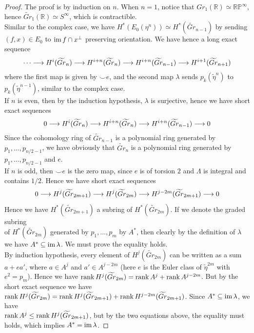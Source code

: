 	\begin{proof}
		The proof is by induction on $n$. When $n=1$, notice that $Gr_1(\mathbb{R})\simeq\mathbb{RP}^\infty$, hence $\widetilde{Gr}_1(\mathbb{R})\simeq S^\infty$, which is contractible. \\
		Similar to the complex case, we have $H^*(E_0(\eta^n))\simeq H^*(\widetilde{Gr}_{n-1})$ by sending $(f,x)\in E_0$ to $\operatorname{\mathrm{im}} f\cap x^\perp$ preserving orientation. We have hence a long exact sequence
		\[ \cdots\longrightarrow H^i(\widetilde{Gr}_n)\longrightarrow H^{i+n}(\widetilde{Gr}_n)\longrightarrow H^{i+n}(\widetilde{Gr}_{n-1})\longrightarrow H^{i+1}(\widetilde{Gr}_{n+1}) \]
		where the first map is given by $\smile e$, and the second map $\lambda$ sends $p_k(\tilde{\eta}^n)$ to $p_k(\tilde{\eta}^{n-1})$, similar to the complex case. \\
		If $n$ is even, then by the induction hypothesis, $\lambda$ is surjective, hence we have short exact sequences 
		\[ 0\longrightarrow H^i(\widetilde{Gr}_n)\longrightarrow H^{i+n}(\widetilde{Gr}_n)\longrightarrow H^{i+n}(\widetilde{Gr}_{n-1})\longrightarrow 0 \]
		Since the cohomology ring of $\widetilde{Gr}_{n-1}$ is a polynomial ring generated by $p_1,\dots,p_{n/2-1}$, we have obviously that $\widetilde{Gr}_n$ is a polynomial ring generated by $p_1,\dots,p_{n/2-1}$ and $e$. \\
		If $n$ is odd, then $\smile e$ is the zero map, since $e$ is of torsion $2$ and $\Lambda$ is integral and contains $1/2$. Hence we have short exact sequences
		\[ 0\longrightarrow H^j(\widetilde{Gr}_{2m+1})\longrightarrow H^j(\widetilde{Gr}_{2m})\longrightarrow H^{j-2m}(\widetilde{Gr}_{2m+1})\longrightarrow 0 \]
		Hence we have $H^*(\widetilde{Gr}_{2m+1})$ a subring of $H^*(\widetilde{Gr}_{2m})$. If we denote the graded subring \\
		of $H^*(\widetilde{Gr}_{2m})$ generated by $p_1,\dots,p_m$ by $A^*$, then clearly by the definition of $\lambda$ we have $A^*\subseteq\operatorname{\mathrm{im}}\lambda$. We must prove the equality holds. \\
		By induction hypothesis, every element of $H^j(\widetilde{Gr}_{2m})$ can be written as a sum $a+ea'$, where $a\in A^j$ and $a'\in A^{j-2m}$ (here $e$ is the Euler class of $\tilde{\eta}^{2m}$ with $e^2=p_m$). Hence we have $\operatorname{\mathrm{rank}} H^j(\widetilde{Gr}_{2m})=\operatorname{\mathrm{rank}} A^j+\operatorname{\mathrm{rank}} A^{j-2m}$. But by the short exact sequence we have \\
		$\operatorname{\mathrm{rank}} H^j(\widetilde{Gr}_{2m})=\operatorname{\mathrm{rank}} H^j(\widetilde{Gr}_{2m+1})+\operatorname{\mathrm{rank}} H^{j-2m}(\widetilde{Gr}_{2m+1})$. Since $A^*\subseteq\operatorname{\mathrm{im}}\lambda$, we have \\
		$\operatorname{\mathrm{rank}} A^j\leq \operatorname{\mathrm{rank}} H^j(\widetilde{Gr}_{2m+1})$, but by the two equations above, the equality must holds, which implies $A^*=\operatorname{\mathrm{im}}\lambda$. 
	\end{proof}


